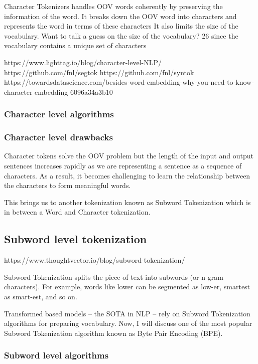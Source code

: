     Character Tokenizers handles OOV words coherently by preserving the information of the word. It breaks down the OOV word into characters and represents the word in terms of these characters
    It also limits the size of the vocabulary. Want to talk a guess on the size of the vocabulary? 26 since the vocabulary contains a unique set of characters

https://www.lighttag.io/blog/character-level-NLP/
https://github.com/fnl/segtok
https://github.com/fnl/syntok
https://towardsdatascience.com/besides-word-embedding-why-you-need-to-know-character-embedding-6096a34a3b10

\subsubsection{Character level algorithms}

\subsubsection{Character level drawbacks}

Character tokens solve the OOV problem but the length of the input and output sentences increases rapidly as we are representing a sentence as a sequence of characters. As a result, it becomes challenging to learn the relationship between the characters to form meaningful words.

This brings us to another tokenization known as Subword Tokenization which is in between a Word and Character tokenization.

\subsection{Subword level tokenization}

https://www.thoughtvector.io/blog/subword-tokenization/

Subword Tokenization splits the piece of text into subwords (or n-gram characters). For example, words like lower can be segmented as low-er, smartest as smart-est, and so on.

Transformed based models – the SOTA in NLP – rely on Subword Tokenization algorithms for preparing vocabulary. Now, I will discuss one of the most popular Subword Tokenization algorithm known as Byte Pair Encoding (BPE).

\subsubsection{Subword level algorithms}

